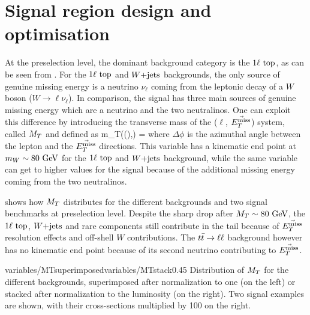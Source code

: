     \section{Signal region design and optimisation \label{sec:analysis_optimization}}

    At the preselection level, the dominant background category is the $1\ell~\text{top}$,
    as can be seen from .
    For the $1\ell~\text{top}$ and $\text{$W$+jets}$ backgrounds, the only source of genuine missing
    energy is a neutrino $\nu_\ell$ coming from the leptonic decay of a $W$ boson ($W
    \rightarrow \ell \nu_{\ell}$). In comparison, the signal has three main sources of
    genuine missing energy which are a neutrino and the two neutralinos.
    One can exploit this difference by introducing the transverse mass of the ($\ell$,
    $\vec{E_T^\text{miss}}$) system, called $M_T$ and defined as
    {
        \MT
        m_T((\ell),\vec{\MET})
        =
    }
    where $\Delta \phi$ is the azimuthal angle between the lepton and the $\vec{E_T^\text{miss}}$
    directions. This variable has a kinematic end point at $m_{W} \sim 80~\text{GeV}$ for the $1\ell~\text{top}$
    and $\text{$W$+jets}$ background, while the same variable can get to higher values for the signal
    because of the additional missing energy coming from the two neutralinos.

     shows how $M_T$ distributes for the different
    backgrounds and two signal benchmarks at preselection level. Despite the sharp drop after
    $M_T \sim 80~\text{GeV}$, the $1\ell~\text{top}$, $\text{$W$+jets}$ and rare components still contribute
    in the tail because of $\vec{E_T^\text{miss}}$ resolution effects and off-shell $W$ contributions.
    The $t\bar{t} \rightarrow \ell \ell$ background however has no kinematic end point because of its second
    neutrino contributing to $\vec{E_T^\text{miss}}$.

                     {variables/MTsuperimposed}{variables/MTstack}{0.45}
                     {Distribution of $M_T$ for the different backgrounds, superimposed
                     after normalization to one (on the left) or stacked after normalization
                     to the luminosity (on the right). Two signal examples are shown, with
                     their cross-sections multiplied by 100 on the right.}

